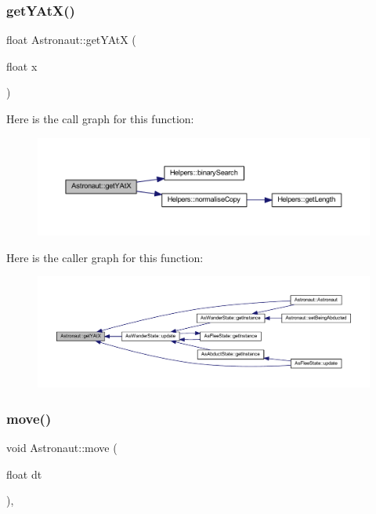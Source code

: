\subsubsection{\texorpdfstring{get\+Y\+At\+X()}{getYAtX()}}
{\footnotesize\ttfamily float Astronaut\+::get\+Y\+AtX (\begin{DoxyParamCaption}\item[{float}]{x }\end{DoxyParamCaption})}

Here is the call graph for this function\+:
\nopagebreak
\begin{figure}[H]
\begin{center}
\leavevmode
\includegraphics[width=350pt]{class_astronaut_accf210f01ffc0bbeaa3b3a9c0004233f_cgraph}
\end{center}
\end{figure}
Here is the caller graph for this function\+:
\nopagebreak
\begin{figure}[H]
\begin{center}
\leavevmode
\includegraphics[width=350pt]{class_astronaut_accf210f01ffc0bbeaa3b3a9c0004233f_icgraph}
\end{center}
\end{figure}
\mbox{\label{class_astronaut_a763eea389d50440a049cd16d92c7c694}} 
\subsubsection{\texorpdfstring{move()}{move()}}
{\footnotesize\ttfamily void Astronaut\+::move (\begin{DoxyParamCaption}\item[{float}]{dt }\end{DoxyParamCaption})\hspace{0.3cm}{\ttfamily [override]}, {\ttfamily [virtual]}}




